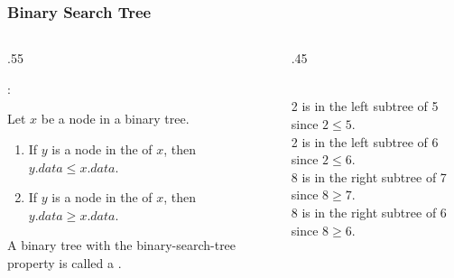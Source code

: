 \documentclass[10pt]{beamer}
\begin{document}




\begin{frame}[t]\frametitle{Binary Search Tree}
	\begin{columns}[T] %
	\begin{column}{.55\linewidth} %
		{\footnotesize 
			\begin{definition}
				 :
				
				Let $x$ be a node in a binary tree.
				
				\begin{enumerate}
				
					\item 
					If $y$ is a node in the  of $x$,
					then $y.data \le x.data$.
				
					\item 
					If $y$ is a node in the  of $x$,
					then $y.data \ge x.data$.
				\end{enumerate}
						
				A binary tree with the binary-search-tree property 
				is called a .\\
			\end{definition}
		} %
				
		\vspace{1cm}
		

	\end{column} %
	\begin{column}{.45\linewidth} %
		\begin{example}
		{\scriptsize
			
			\\		
			2 is in the left subtree of 5 since $2 \le 5$.\\
			2 is in the left subtree of 6 since $2 \le 6$.\\
			8 is in the right subtree of 7 since $8 \ge 7$.\\
			8 is in the right subtree of 6 since $8 \ge 6$.\\

		} %
		\end{example}

	\end{column} %
	\end{columns} %
\end{frame}
\end{document}
